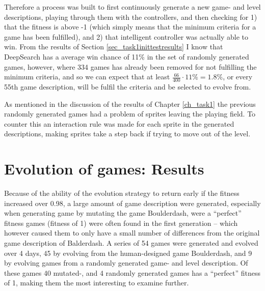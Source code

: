 \documentclass[a4paper,titlepage,final]{report}
\begin{document}
Therefore a process was built to first continuously generate a new game- and level descriptions, playing through them with the controllers, and then checking for 1) that the fitness is above -1 (which simply means that the minimum criteria for a game has been fulfilled), and 2) that intelligent controller was actually able to win.
From the results of Section \ref{sec_task1inittestresults} I know that DeepSearch has a average win chance of 11\% in the set of randomly generated games, however, where 334 games has already been removed for not fulfilling the minimum criteria, and so we can expect that at least $\frac{66}{400}\cdot 11\% = 1.8\%$, or every 55th game description, will be fulfil the criteria and be selected to evolve from.

As mentioned in the discussion of the results of Chapter \ref{ch_task1} the previous randomly generated games had a problem of sprites leaving the playing field.
To counter this an interaction rule was made for each sprite in the generated descriptions, making sprites take a step back if trying to move out of the level.

%
%
%


\section{Evolution of games: Results}
\label{sec_task2evolvingGames}
Because of the ability of the evolution strategy to return early if the fitness increased over 0.98, a large amount of game description were generated, especially when generating game by mutating the game Boulderdash, were a ``perfect'' fitness games (fitness of 1) were often found in the first generation -- which however caused them to only have a small number of differences from the original game description of Balderdash.
A series of 54 games were generated and evolved over 4 days, 45 by evolving from the human-designed game Boulderdash, and 9 by evolving games from a randomly generated game- and level description.
Of these games 40 mutated-, and 4 randomly generated games has a ``perfect'' fitness of 1, making them the most interesting to examine further.
\end{document}
